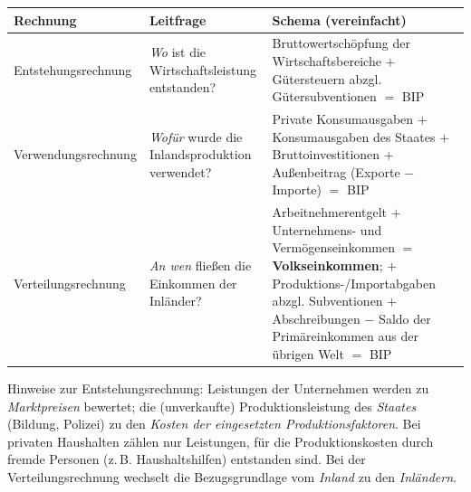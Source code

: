 \documentclass[11pt, a4paper]{article}
\begin{document}
\begin{center}
\begin{tabular}{p{3.4cm} p{4.6cm} p{6.4cm}}
\toprule
\textbf{Rechnung} & \textbf{Leitfrage} & \textbf{Schema (vereinfacht)}\\
\midrule
Entstehungs\-rechnung & \emph{Wo} ist die Wirtschaftsleistung entstanden? & Bruttowertschöpfung der Wirtschaftsbereiche $+$ Gütersteuern abzgl. Gütersubventionen $=$ BIP\\
Verwendungs\-rechnung & \emph{Wofür} wurde die Inlandsproduktion verwendet? & Private Konsumausgaben $+$ Konsumausgaben des Staates $+$ Bruttoinvestitionen $+$ Außenbeitrag (Exporte $-$ Importe) $=$ BIP\\
Verteilungs\-rechnung & \emph{An wen} fließen die Einkommen der Inländer? & Arbeitnehmerentgelt $+$ Unternehmens- und Vermögenseinkommen $=$ \textbf{Volkseinkommen}; $+$ Produktions-/Importabgaben abzgl. Subventionen $+$ Abschreibungen $-$ Saldo der Primäreinkommen aus der übrigen Welt $=$ BIP\\
\bottomrule
\end{tabular}
\end{center}

Hinweise zur Entstehungsrechnung: Leistungen der Unternehmen werden zu \emph{Marktpreisen}
bewertet; die (unverkaufte) Produktionsleistung des \emph{Staates} (Bildung, Polizei) zu
den \emph{Kosten der eingesetzten Produktionsfaktoren}. Bei privaten Haushalten zählen nur
Leistungen, für die Produktionskosten durch fremde Personen (z.\,B. Haushaltshilfen)
entstanden sind. Bei der Verteilungsrechnung wechselt die Bezugsgrundlage vom
\emph{Inland} zu den \emph{Inländern}.
\end{document}
